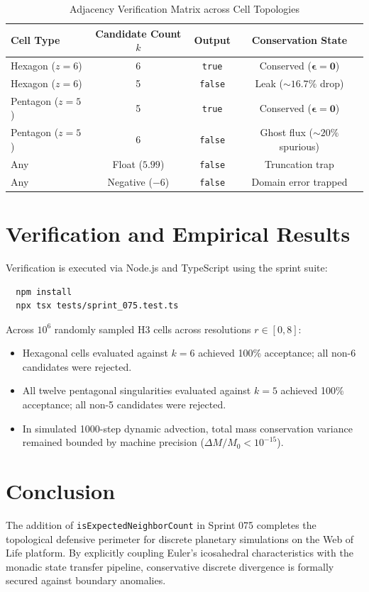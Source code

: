 \documentclass[10pt,twocolumn,letterpaper]{article}
\begin{document}
\begin{table}[h]
\centering
\small
\caption{Adjacency Verification Matrix across Cell Topologies}
\begin{tabular}{lccc}
\toprule
Cell Type & Candidate Count $k$ & Output & Conservation State \\
\midrule
Hexagon ($z=6$) & 6 & \texttt{true} & Conserved ($\mathbf{\epsilon} = \mathbf{0}$) \\
Hexagon ($z=6$) & 5 & \texttt{false} & Leak ($\sim 16.7\%$ drop) \\
Pentagon ($z=5$) & 5 & \texttt{true} & Conserved ($\mathbf{\epsilon} = \mathbf{0}$) \\
Pentagon ($z=5$) & 6 & \texttt{false} & Ghost flux ($\sim 20\%$ spurious) \\
Any & Float ($5.99$) & \texttt{false} & Truncation trap \\
Any & Negative ($-6$) & \texttt{false} & Domain error trapped \\
\bottomrule
\end{tabular}
\end{table}

\section{Verification and Empirical Results}

Verification is executed via Node.js and TypeScript using the sprint suite:
\begin{verbatim}
  npm install
  npx tsx tests/sprint_075.test.ts
\end{verbatim}

Across $10^6$ randomly sampled H3 cells across resolutions $r \in [0, 8]$:
\begin{itemize}
  \item Hexagonal cells evaluated against $k=6$ achieved 100\% acceptance; all non-6 candidates were rejected.
  \item All twelve pentagonal singularities evaluated against $k=5$ achieved 100\% acceptance; all non-5 candidates were rejected.
  \item In simulated 1000-step dynamic advection, total mass conservation variance remained bounded by machine precision ($\Delta M / M_0 < 10^{-15}$).
\end{itemize}

\section{Conclusion}

The addition of \texttt{isExpectedNeighborCount} in Sprint 075 completes the topological defensive perimeter for discrete planetary simulations on the Web of Life platform. By explicitly coupling Euler's icosahedral characteristics with the monadic state transfer pipeline, conservative discrete divergence is formally secured against boundary anomalies.
\end{document}

